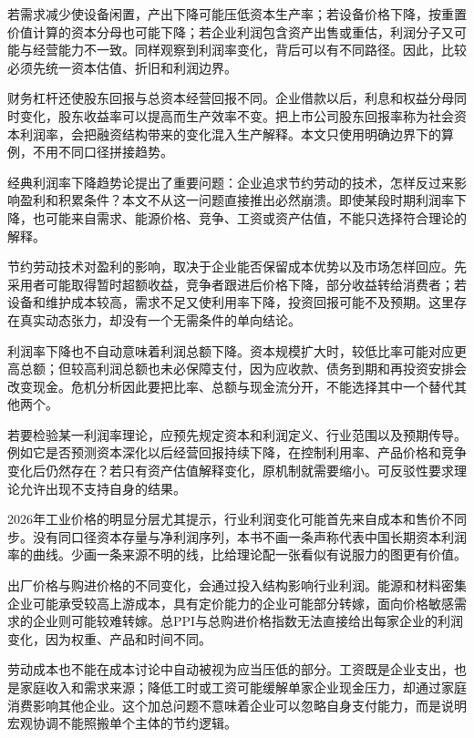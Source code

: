 \documentclass[UTF8,fontset=fandol,zihao=-4,oneside,openany]{ctexbook}
\begin{document}
若需求减少使设备闲置，产出下降可能压低资本生产率；若设备价格下降，按重置价值计算的资本分母也可能下降；若企业利润包含资产出售或重估，利润分子又可能与经营能力不一致。同样观察到利润率变化，背后可以有不同路径。因此，比较必须先统一资本估值、折旧和利润边界。

财务杠杆还使股东回报与总资本经营回报不同。企业借款以后，利息和权益分母同时变化，股东收益率可以提高而生产效率不变。把上市公司股东回报率称为社会资本利润率，会把融资结构带来的变化混入生产解释。本文只使用明确边界下的算例，不用不同口径拼接趋势。

经典利润率下降趋势论提出了重要问题：企业追求节约劳动的技术，怎样反过来影响盈利和积累条件？本文不从这一问题直接推出必然崩溃。即使某段时期利润率下降，也可能来自需求、能源价格、竞争、工资或资产估值，不能只选择符合理论的解释。\cite{Marx3}

\label{arg:P227}
节约劳动技术对盈利的影响，取决于企业能否保留成本优势以及市场怎样回应。先采用者可能取得暂时超额收益，竞争者跟进后价格下降，部分收益转给消费者；若设备和维护成本较高，需求不足又使利用率下降，投资回报可能不及预期。这里存在真实动态张力，却没有一个无需条件的单向结论。

利润率下降也不自动意味着利润总额下降。资本规模扩大时，较低比率可能对应更高总额；但较高利润总额也未必保障支付，因为应收款、债务到期和再投资安排会改变现金。危机分析因此要把比率、总额与现金流分开，不能选择其中一个替代其他两个。

若要检验某一利润率理论，应预先规定资本和利润定义、行业范围以及预期传导。例如它是否预测资本深化以后经营回报持续下降，在控制利用率、产品价格和竞争变化后仍然存在？若只有资产估值解释变化，原机制就需要缩小。可反驳性要求理论允许出现不支持自身的结果。

2026年工业价格的明显分层尤其提示，行业利润变化可能首先来自成本和售价不同步。没有同口径资本存量与净利润序列，本书不画一条声称代表中国长期资本利润率的曲线。少画一条来源不明的线，比给理论配一张看似有说服力的图更有价值。

\label{arg:P228}
出厂价格与购进价格的不同变化，会通过投入结构影响行业利润。能源和材料密集企业可能承受较高上游成本，具有定价能力的企业可能部分转嫁，面向价格敏感需求的企业则可能较难转嫁。总PPI与总购进价格指数无法直接给出每家企业的利润变化，因为权重、产品和时间不同。\cite{PPI2026}

劳动成本也不能在成本讨论中自动被视为应当压低的部分。工资既是企业支出，也是家庭收入和需求来源；降低工时或工资可能缓解单家企业现金压力，却通过家庭消费影响其他企业。这个加总问题不意味着企业可以忽略自身支付能力，而是说明宏观协调不能照搬单个主体的节约逻辑。
\end{document}
